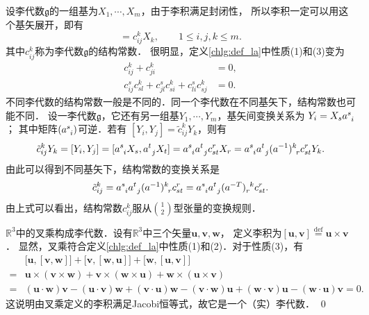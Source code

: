设李代数$\mathfrak{g}$的一组基为$X_1, \cdots ,X_m$，由于李积满足封闭性，
所以李积一定可以用这个基矢展开，即有
\begin{equation}
    [X_i, X_j] =c_{ij}^k X_k, \qquad 1 \leqslant i,j,k \leqslant m .
\end{equation}
其中$c_{ij}^k$称为李代数$\mathfrak{g}$的{\heiti 结构常数}．
很明显，定义\ref{chlg:def_la}中性质(1)和(3)变为
\begin{align}
    c_{ij}^k +c_{ji}^k &= 0, \label{chlg:eqn_Cij=Cji} \\
    c_{ij}^s c_{sl}^k + c_{jl}^s c_{si}^k + c_{li}^s c_{sj}^k &=0. \label{chlg:eqn_CCC}
\end{align}
不同李代数的结构常数一般是不同的．同一个李代数在不同基矢下，结构常数也可能不同．
设一李代数$\mathfrak{g}$，它还有另一组基$Y_1, \cdots ,Y_m$，基矢间变换关系为
$    Y_i = X_s a_{\hphantom{s} i}^s  $；
其中矩阵$(a_{\hphantom{s} i}^s)$可逆．若有
$    [Y_i, Y_j] =\tilde{c}^{k}_{ij} Y_k $，则有
\begin{equation}
    \tilde{c}^{k}_{ij} Y_k= [Y_i, Y_j] = [a_{\hphantom{s} i}^s X_s, a_{\hphantom{s} j}^t X_t]
    =a_{\hphantom{s} i}^s a_{\hphantom{s} j}^t c_{st}^r X_r
    =a_{\hphantom{s} i}^s a_{\hphantom{s} j}^t (a^{-1})^k_{\hphantom{s} r} c_{st}^r Y_k .
\end{equation}
由此可以得到不同基矢下，结构常数的变换关系是
\begin{equation}\label{chlg:eqn_LAC-trans}
    \tilde{c}^{k}_{ij}  =a_{\hphantom{s} i}^s a_{\hphantom{s} j}^t (a^{-1})^k_{\hphantom{s} r} c_{st}^r 
    =a_{\hphantom{s} i}^s a_{\hphantom{s} j}^t (a^{-T})^{\hphantom{s} k}_{r} c_{st}^r  .
\end{equation}
由上式可以看出，结构常数$c^k_{ij}$服从$\binom{1}{2}$型张量的变换规则．


\begin{example}
    $\mathbb{R}^3$中的叉乘构成李代数．设有$\mathbb{R}^3$中三个矢量$\boldsymbol{u},\boldsymbol{v},\boldsymbol{w}$，
    定义李积为$[\boldsymbol{u},\boldsymbol{v}]\overset{\mathrm {def}}{=}\boldsymbol{u} \times \boldsymbol{v}$．
    显然，叉乘符合定义\ref{chlg:def_la}中性质(1)和(2)．对于性质(3)，有
    \begin{align*}
        &\bigl[\boldsymbol{u},[\boldsymbol{v},\boldsymbol{w}]\bigr]
        +\bigl[\boldsymbol{v},[\boldsymbol{w},\boldsymbol{u}]\bigr]+\bigl[\boldsymbol{w},
        [\boldsymbol{u},\boldsymbol{v}]\bigr] \\
      =& \boldsymbol{u} \times (\boldsymbol{v}\times \boldsymbol{w})+\boldsymbol{v} \times 
      (\boldsymbol{w}\times \boldsymbol{u})+\boldsymbol{w} \times (\boldsymbol{u}\times \boldsymbol{v}) \\
      =& (\boldsymbol{u}\cdot\boldsymbol{w}) \boldsymbol{v}  - (\boldsymbol{u}\cdot\boldsymbol{v}) \boldsymbol{w}
        +(\boldsymbol{v}\cdot\boldsymbol{u}) \boldsymbol{w}  - (\boldsymbol{v}\cdot\boldsymbol{w}) \boldsymbol{u}
        +(\boldsymbol{w}\cdot\boldsymbol{v}) \boldsymbol{u}  - (\boldsymbol{w}\cdot\boldsymbol{u}) \boldsymbol{v} = 0 .
    \end{align*}
    这说明由叉乘定义的李积满足Jacobi恒等式，故它是一个（实）李代数． \qed
\end{example}


